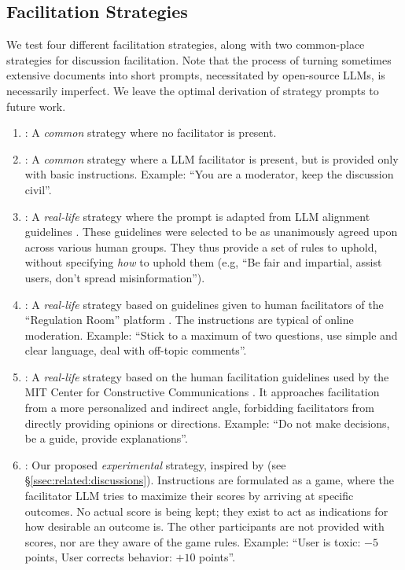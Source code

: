 \subsection{Facilitation Strategies}
\label{ssec:experimental:strategies}

We test four different facilitation strategies, along with two common-place strategies for discussion facilitation. Note that the process of turning sometimes extensive documents into short prompts, necessitated by open-source LLMs, is necessarily imperfect. We leave the optimal derivation of strategy prompts to future work.

\begin{enumerate}
    \item \textbf{\strategynomod}: A \emph{common} strategy where no facilitator is present.

    \item \textbf{\strategynoinstr}: A \emph{common} strategy where a LLM facilitator is present, but is provided only with basic instructions. Example: “You are a moderator, keep the discussion civil”.

    \item \textbf{\strategyrules}: A \emph{real-life} strategy where the prompt is adapted from LLM alignment guidelines \cite{collective_constitution}. These guidelines were selected to be as unanimously agreed upon across various human groups. They thus provide a set of rules to uphold, without specifying \emph{how} to uphold them (e.g, “Be fair and impartial, assist users, don't spread misinformation”).

    \item \textbf{\strategyregroom}: A \emph{real-life} strategy based on guidelines given to human facilitators of the ``Regulation Room'' platform \citep{Cornell_eRulemaking2017}. The instructions are typical of online moderation. Example: ``Stick to a maximum of two questions, use simple and clear language, deal with off-topic comments''.

    \item \textbf{\strategyconstrcomm}: A \emph{real-life} strategy based on the human facilitation guidelines used by the MIT Center for Constructive Communications \cite{dimitra-book}. It approaches facilitation from a more personalized and indirect angle, forbidding facilitators from directly providing opinions or directions. Example: ``Do not make decisions, be a guide, provide explanations''.
    
    \item \textbf{\strategymodgame}: Our proposed \emph{experimental} strategy, inspired by \citet{abdelnabi_negotiations} (see \S\ref{ssec:related:discussions}). Instructions are formulated as a game, where the facilitator LLM tries to maximize their scores by arriving at specific outcomes. No actual score is being kept; they exist to act as indications for how desirable an outcome is. The other participants are not provided with scores, nor are they aware of the game rules. Example: ``User is toxic: $-5$ points, User corrects behavior: $+10$ points''.
\end{enumerate}



